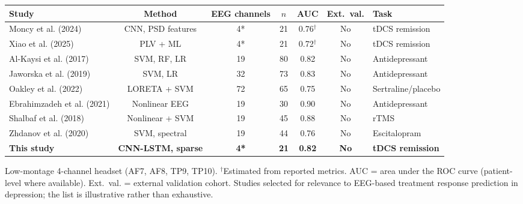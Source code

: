 \begin{tabular}{lcccccl}
\toprule
Study & Method & EEG channels & $n$ & AUC & Ext.\ val. & Task \\
\midrule
Moncy et al. (2024) & CNN, PSD features & 4* & 21 & 0.76$^\dagger$ & No & tDCS remission \\
Xiao et al. (2025) & PLV + ML & 4* & 21 & 0.72$^\dagger$ & No & tDCS remission \\
Al-Kaysi et al. (2017) & SVM, RF, LR & 19 & 80 & 0.82 & No & Antidepressant \\
Jaworska et al. (2019) & SVM, LR & 32 & 73 & 0.83 & No & Antidepressant \\
Oakley et al. (2022) & LORETA + SVM & 72 & 65 & 0.75 & No & Sertraline/placebo \\
Ebrahimzadeh et al. (2021) & Nonlinear EEG & 19 & 30 & 0.90 & No & Antidepressant \\
Shalbaf et al. (2018) & Nonlinear + SVM & 19 & 45 & 0.88 & No & rTMS \\
Zhdanov et al. (2020) & SVM, spectral & 19 & 44 & 0.76 & No & Escitalopram \\
\textbf{This study} & \textbf{CNN-LSTM, sparse} & \textbf{4*} & \textbf{21} & \textbf{0.82} & \textbf{No} & \textbf{tDCS remission} \\
\bottomrule
\end{tabular}

\smallskip
\footnotesize *Low-montage 4-channel headset (AF7, AF8, TP9, TP10). $^\dagger$Estimated from reported metrics. AUC = area under the ROC curve (patient-level where available). Ext.\ val. = external validation cohort. Studies selected for relevance to EEG-based treatment response prediction in depression; the list is illustrative rather than exhaustive.
